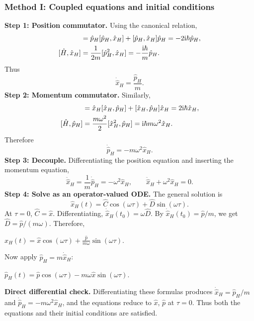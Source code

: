 \documentclass[11pt,a4paper]{article}
\newcommand{\key}[1]{\begin{resultbox}\centering\(\displaystyle #1\)\end{resultbox}}
\begin{document}
\subsubsection{Method I: Coupled equations and initial conditions}
\textbf{Step 1: Position commutator.} Using the canonical relation,
\begin{align}
[\hat p_H^2,\hat x_H]&=\hat p_H[\hat p_H,\hat x_H]+[\hat p_H,\hat x_H]\hat p_H=-2\iu\hbar\hat p_H,\\
[\hat H,\hat x_H]&=\frac1{2m}[\hat p_H^2,\hat x_H]=-\frac{\iu\hbar}{m}\hat p_H.
\end{align}
Thus
\begin{equation}\boxed{\dot{\hat x}_H=\frac{\hat p_H}{m}.}\end{equation}
\textbf{Step 2: Momentum commutator.} Similarly,
\begin{align}
[\hat x_H^2,\hat p_H]&=\hat x_H[\hat x_H,\hat p_H]+[\hat x_H,\hat p_H]\hat x_H=2\iu\hbar\hat x_H,\\
[\hat H,\hat p_H]&=\frac{m\omega^2}{2}[\hat x_H^2,\hat p_H]=\iu\hbar m\omega^2\hat x_H.
\end{align}
Therefore
\begin{equation}\boxed{\dot{\hat p}_H=-m\omega^2\hat x_H.}\end{equation}
\textbf{Step 3: Decouple.} Differentiating the position equation and inserting the momentum equation,
\begin{equation}\ddot{\hat x}_H=\frac1m\dot{\hat p}_H=-\omega^2\hat x_H,\qquad\boxed{\ddot{\hat x}_H+\omega^2\hat x_H=0.}\end{equation}
\textbf{Step 4: Solve as an operator-valued ODE.} The general solution is
\begin{equation}\hat x_H(t)=\hat C\cos(\omega\tau)+\hat D\sin(\omega\tau).\end{equation}
At \(\tau=0\), \(\hat C=\hat x\). Differentiating, \(\dot{\hat x}_H(t_0)=\omega\hat D\). By \(\dot{\hat x}_H(t_0)=\hat p/m\), we get \(\hat D=\hat p/(m\omega)\). Therefore,
\key{\boxed{\hat x_H(t)=\hat x\cos(\omega\tau)+\frac{\hat p}{m\omega}\sin(\omega\tau).}}
Now apply \(\hat p_H=m\dot{\hat x}_H\):
\key{\boxed{\hat p_H(t)=\hat p\cos(\omega\tau)-m\omega\hat x\sin(\omega\tau).}}
\textbf{Direct differential check.} Differentiating these formulas produces \(\dot{\hat x}_H=\hat p_H/m\) and \(\dot{\hat p}_H=-m\omega^2\hat x_H\), and the equations reduce to \(\hat x\), \(\hat p\) at \(\tau=0\). Thus both the equations and their initial conditions are satisfied.
\end{document}
